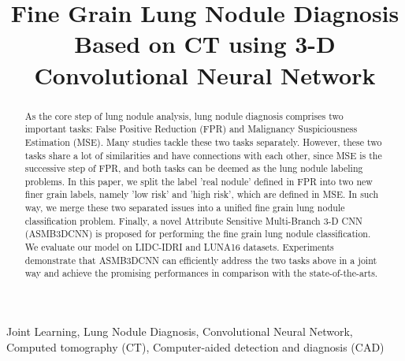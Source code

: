 \documentclass{article}
\title{%
Fine Grain Lung Nodule Diagnosis Based on CT using 3-D Convolutional Neural Network}
\begin{document}
%
\maketitle
%
\begin{abstract}

As the core step of lung nodule analysis, lung nodule diagnosis comprises two important tasks: False Positive Reduction (FPR) and Malignancy Suspiciousness Estimation (MSE). Many studies tackle these two tasks separately. However, these two tasks share a lot of similarities and have connections with each other, since MSE is the successive step of FPR, and both tasks can be deemed as the lung nodule labeling problems. In this paper, we split the label 'real nodule' defined in FPR into two new finer grain labels, namely 'low risk' and 'high risk', which are defined in MSE. In such way, we merge these two separated issues into a unified fine grain lung nodule classification problem. Finally, a novel Attribute Sensitive Multi-Branch 3-D CNN (ASMB3DCNN) is proposed for performing the fine grain lung nodule classification. We evaluate our model on LIDC-IDRI and LUNA16 datasets. Experiments demonstrate that ASMB3DCNN can efficiently address the two tasks above in a joint way and achieve the promising performances in comparison with the state-of-the-arts.

\end{abstract}
%
\begin{keywords}
Joint Learning, Lung Nodule Diagnosis, Convolutional Neural Network, Computed tomography (CT), Computer-aided detection and diagnosis (CAD)
\end{keywords}
%
\end{document}
